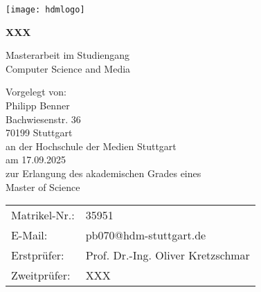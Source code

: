 \begin{titlepage}
\begin{center}
   \texttt{[image: hdmlogo]}
   
   \vspace{3cm}
   
   \large
    \textbf{XXX}
    \vspace{1cm}
    
    \normalsize
    Masterarbeit im Studiengang\\
    Computer Science and Media
    \vspace{2cm}
    
    \footnotesize
    Vorgelegt von:\\
    \bigskip
    Philipp Benner\\
    Bachwiesenstr. 36\\
    70199 Stuttgart\\
    \bigskip
    an der Hochschule der Medien Stuttgart \\
    am 17.09.2025\\
    zur Erlangung des akademischen Grades eines\\
    Master of Science\\

    
\end{center}
    \vfill
    \footnotesize

    \begin{tabular}{ll}
    Matrikel-Nr.: & 35951\\
    E-Mail: & pb070@hdm-stuttgart.de\\
    Erstprüfer: & Prof. Dr.-Ing. Oliver Kretzschmar\\
    Zweitprüfer: & XXX
    \end{tabular}





\end{titlepage}
